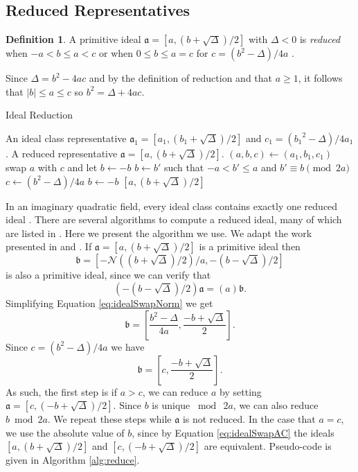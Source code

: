 \documentclass{ucalgthes1}
\theoremstyle{definition}
\newtheorem{defn}[thm]{Definition}
\begin{document}
\subsection{Reduced Representatives}
\label{subsec:reduction}

\begin{defn}
\label{defn:reducedIdeal}
A primitive ideal $\mathfrak{a} = [a, (b+\sqrt{\Delta})/2]$ with $\Delta < 0$ is \emph{reduced} when $-a < b \le a < c$ or when $0 \le b \le a = c$ for $c = (b^2 - \Delta)/4a$ \cite[p.241]{Crandall2001}.
\end{defn}

Since $\Delta = b^2 -4ac$ and by the definition of reduction and that $a \ge 1$, it follows that $|b| \le a \le c$ so $b^2 = \Delta +4ac$.

\begin{algorithm}[h]
\caption{Ideal Reduction}
\label{alg:reduce}
\begin{algorithmic}[1]
\REQUIRE An ideal class representative $\mathfrak a_1 = [a_1, (b_1+\sqrt\Delta)/2]$ and $c_1 = ({b_1}^2 - \Delta)/4a_1$.
\ENSURE A reduced representative $\mathfrak a = [a, (b+\sqrt\Delta)/2]$.
\STATE $(a, b, c) \gets (a_1, b_1, c_1)$
		\STATE swap $a$ with $c$ and let $b \gets -b$
	\ENDIF
		\STATE $b \gets b'$ such that $-a < b' \le a$ and $b' \equiv b \pmod{2a}$
		\STATE $c \gets (b^2-\Delta)/4a$
	\ENDIF
\ENDWHILE
{}
	\STATE $b \gets -b$
\ENDIF
\RETURN $[a, (b+\sqrt\Delta)/2]$
\end{algorithmic}
\end{algorithm}

In an imaginary quadratic field, every ideal class contains exactly one reduced ideal \cite[p.20]{Ramachandran2006}.  There are several algorithms to compute a reduced ideal, many of which are listed in \cite{Jacobson2006}.  Here we present the algorithm we use.  We adapt the work presented in \cite[p.90]{Jacobson2006} and \cite[p.99]{Jacobson2009}. If $\mathfrak a = [a, (b + \sqrt\Delta)/2]$ is a primitive ideal then 
\begin{equation}
\label{eq:idealSwapNorm}
	\mathfrak b = \left[ -\mathcal N((b + \sqrt\Delta)/2)/a, -(b - \sqrt\Delta)/2 \right]
\end{equation}
is also a primitive ideal, since we can verify that
\[
	\left(-(b - \sqrt\Delta)/2 \right) \mathfrak a = (a) \mathfrak b.
\]
Simplifying Equation \ref{eq:idealSwapNorm} we get
\[
	\mathfrak b = \left[ \frac{b^2-\Delta}{4a}, \frac{-b + \sqrt\Delta}{2} \right].
\]
Since $c = (b^2 - \Delta)/4a$ we have
\begin{equation}
\label{eq:idealSwapAC}
	\mathfrak b = \left[ c, \frac{-b + \sqrt\Delta}{2} \right].
\end{equation}
As such, the first step is if $a > c$, we can reduce $a$ by setting $\mathfrak a = [c, (-b + \sqrt\Delta)/2]$.  Since $b$ is unique $\bmod{~2a}$, we can also reduce $b \bmod{2a}$.  We repeat these steps while $\mathfrak a$ is not reduced.  In the case that $a = c$, we use the absolute value of $b$, since by Equation \ref{eq:idealSwapAC} the ideals $[a, (b + \sqrt\Delta)/2]$ and $[c, (-b+\sqrt\Delta)/2]$ are equivalent.  Pseudo-code is given in Algorithm \ref{alg:reduce}.
\end{document}
